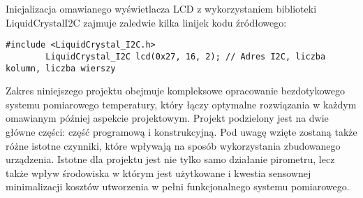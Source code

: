     \vspace{12pt}
    
    Inicjalizacja omawianego wyświetlacza LCD z wykorzystaniem biblioteki LiquidCrystalI2C zajmuje zaledwie kilka linijek kodu źródłowego:

    \begin{lstlisting}[style=mystyle]
        #include <LiquidCrystal_I2C.h>
        LiquidCrystal_I2C lcd(0x27, 16, 2); // Adres I2C, liczba kolumn, liczba wierszy
        \end{lstlisting}
    
    Zakres niniejszego projektu obejmuje kompleksowe opracowanie bezdotykowego systemu pomiarowego temperatury, który łączy optymalne rozwiązania w każdym omawianym później aspekcie projektowym. Projekt podzielony jest na dwie główne części: część programową i konstrukcyjną. Pod uwagę wzięte zostaną także różne istotne czynniki, które wpływają na sposób wykorzystania zbudowanego urządzenia. Istotne dla projektu jest nie tylko samo działanie pirometru, lecz także wpływ środowiska w którym jest użytkowane i kwestia sensownej minimalizacji kosztów utworzenia w pełni funkcjonalnego systemu pomiarowego.